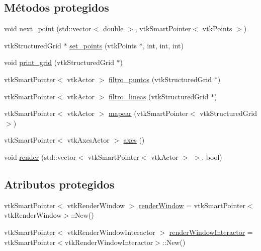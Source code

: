 \subsection*{Métodos protegidos}
\begin{DoxyCompactItemize}
\item 
void \hyperlink{class_gpadre_a7f14881edc7efd75801b1734dd919126}{next\+\_\+point} (std\+::vector$<$ double $>$, vtk\+Smart\+Pointer$<$ vtk\+Points $>$)
\item 
vtk\+Structured\+Grid $\ast$ \hyperlink{class_gpadre_a9dd73d0f23f1217b6ce4b48bb3fb1a16}{set\+\_\+points} (vtk\+Points $\ast$, int, int, int)
\item 
void \hyperlink{class_gpadre_a083d739f47fa034916366e714ddf6737}{print\+\_\+grid} (vtk\+Structured\+Grid $\ast$)
\item 
vtk\+Smart\+Pointer$<$ vtk\+Actor $>$ \hyperlink{class_gpadre_ae4adbdbc81a5121ba96d93c884c0196e}{filtro\+\_\+puntos} (vtk\+Structured\+Grid $\ast$)
\item 
vtk\+Smart\+Pointer$<$ vtk\+Actor $>$ \hyperlink{class_gpadre_ad22a3d28e46be883935b638c35c0a9dd}{filtro\+\_\+lineas} (vtk\+Structured\+Grid $\ast$)
\item 
vtk\+Smart\+Pointer$<$ vtk\+Actor $>$ \hyperlink{class_gpadre_af108d3defe91516b543dd08cfc1f4c5c}{mapear} (vtk\+Smart\+Pointer$<$ vtk\+Structured\+Grid $>$)
\item 
vtk\+Smart\+Pointer$<$ vtk\+Axes\+Actor $>$ \hyperlink{class_gpadre_a165bbe5dcd20c4d77b0c4277f41f3b0e}{axes} ()
\item 
void \hyperlink{class_gpadre_a33060a2381e76b38f3883619cbb7b73f}{render} (std\+::vector$<$ vtk\+Smart\+Pointer$<$ vtk\+Actor $>$ $>$, bool)
\end{DoxyCompactItemize}
\subsection*{Atributos protegidos}
\begin{DoxyCompactItemize}
\item 
vtk\+Smart\+Pointer$<$ vtk\+Render\+Window $>$ \hyperlink{class_gpadre_af512cc11dc03408872e033cec640d8ba}{render\+Window} = vtk\+Smart\+Pointer$<$vtk\+Render\+Window$>$\+::New()
\item 
vtk\+Smart\+Pointer$<$ vtk\+Render\+Window\+Interactor $>$ \hyperlink{class_gpadre_a31b647d46719088a5cb59688cdb2fe8a}{render\+Window\+Interactor} = vtk\+Smart\+Pointer$<$vtk\+Render\+Window\+Interactor$>$\+::New()
\end{DoxyCompactItemize}


